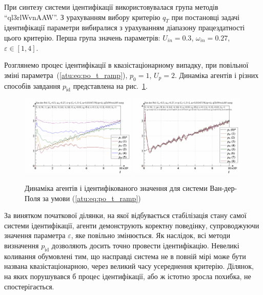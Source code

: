 При синтезу системи ідентифікації використовувалася група
методів ``ql3rlWvnAAW''. З урахуванням вибору критерію
$ q_{T} $ при постановці задачі ідентифікації параметри
вибиралися з урахуванням діапазону працездатності цього
критерію. Перша група значень параметрів:
$ U_{in} = 0.3 $,
$ \omega_{in} = 0.27 $,
$ \varepsilon \in [1, 4]$.

Розглянемо процес ідентифікації в квазістаціонарному випадку,
при повільної зміні параметра~(\ref{atu:eq:po_t_ramp}),
$ p_0 = 1 $,
$ U_p = 2 $. Динаміка агентів і різних способів завдання
$ p_\mathrm{id} $ представлена на рис.~\ref{atu:f:vdp_id1_ramp}.

\begin{figure}[ht!]
\begin{center}
  \includegraphics[width=0.49\textwidth]{p/cha/vdp/vdp_id-p_t_pi_ql3rlWvnAAW_ramp.png}
  \hfill
  \includegraphics[width=0.49\textwidth]{p/cha/vdp/vdp_id-p_t_p_ql3rlWvnAAW_ramp.png}
\end{center}
\caption{Динаміка агентів і ідентифікованого значення для системи Ван-дер-Поля за умови (\ref{atu:eq:po_t_ramp})}
\label{atu:f:vdp_id1_ramp}
\end{figure}

За винятком початкової ділянки, на якої відбувається
стабілізація стану самої системи ідентифікації, агенти
демонструють коректну поведінку, супроводжуючи значення параметра
$ \varepsilon $, яке повільно змінюється.
Як наслідок, всі методи визначення
$ p_\mathrm{id} $ дозволяють досить точно провести
ідентифікацію. Невеликі коливання обумовлені тим, що насправді
система не в повній мірі може бути названа квазістаціонарною,
через великий часу усереднення критерію. Ділянок, на яких
порушувався б процес ідентифікації, або ж істотно зросла
похибка, не спостерігається.

